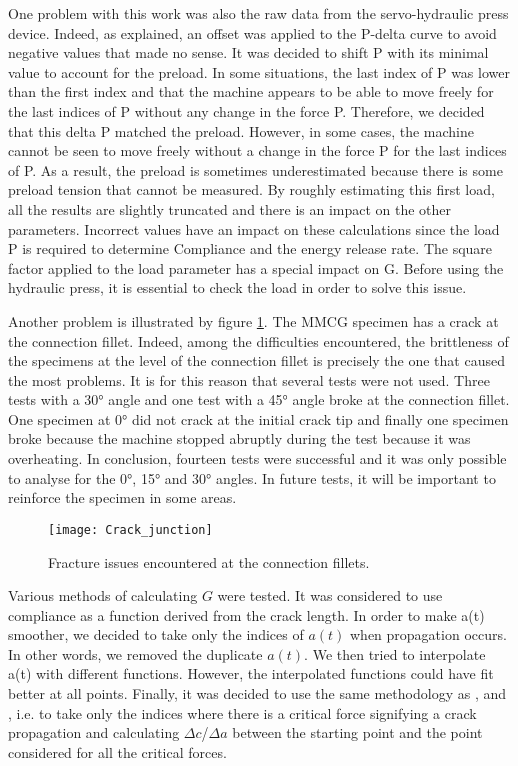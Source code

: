 One problem with this work was also the raw data from the servo-hydraulic press device. Indeed, as explained, an offset was applied to the P-delta curve to avoid negative values that made no sense. It was decided to shift P with its minimal value to account for the preload. In some situations, the last index of P was lower than the first index and that the machine appears to be able to move freely for the last indices of P without any change in the force P. Therefore, we decided that this delta P matched the preload. However, in some cases, the machine cannot be seen to move freely without a change in the force P for the last indices of P. As a result, the preload is sometimes underestimated because there is some preload tension that cannot be measured.
By roughly estimating this first load, all the results are slightly truncated and there is an impact on the other parameters. Incorrect values have an impact on these calculations since the load P is required to determine Compliance and the energy release rate. The square factor applied to the load parameter has a special impact on G. Before using the hydraulic press, it is essential to check the load in order to solve this issue.

Another problem is illustrated by figure \ref{fig:Crack_junction}. The MMCG specimen has a crack at the connection fillet. Indeed, among the difficulties encountered, the brittleness of the specimens at the level of the connection fillet is precisely the one that caused the most problems. It is for this reason that several tests were not used. Three tests with a 30° angle and one test with a 45° angle broke at the connection fillet. One specimen at 0° did not crack at the initial crack tip and finally one specimen broke because the machine stopped abruptly during the test because it was overheating. In conclusion, fourteen tests were successful and it was only possible to analyse for the 0°, 15° and 30° angles. In future tests, it will be important to reinforce the specimen in some areas.

\begin{figure}[htp]
	\centering
	\texttt{[image: Crack\_junction]}
	\caption{Fracture issues encountered at the connection fillets.}
	\label{fig:Crack_junction}
\end{figure}

Various methods of calculating $G$ were tested. It was considered to use compliance as a function derived from the crack length. In order to make a(t) smoother, we decided to take only the indices of $a(t)$ when propagation occurs. In other words, we removed the duplicate $a(t)$. We then tried to interpolate a(t) with different functions. However, the interpolated functions could have fit better at all points.
Finally, it was decided to use the same methodology as \cite{MoutouPitti2008}, \cite{Mambili2018} and  \cite{Odounga2018phd}, i.e. to take only the indices where there is a critical force signifying a crack propagation and calculating $\Delta c$/$\Delta a$ between the starting point and the point considered for all the critical forces.

